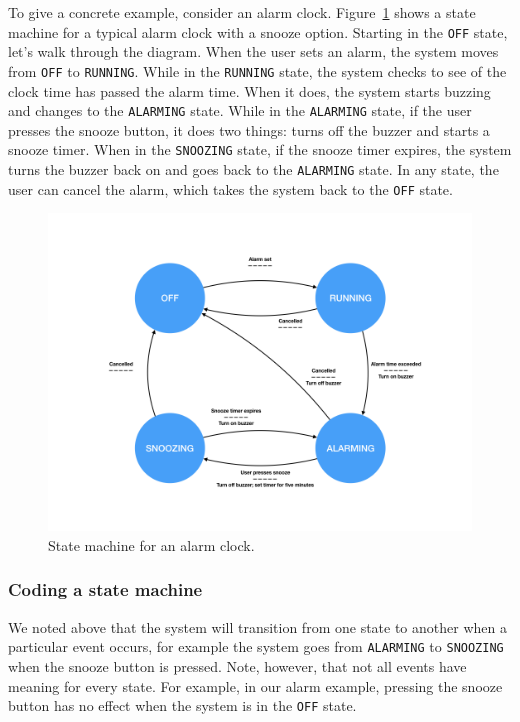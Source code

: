 \documentclass[11pt]{article} %
\begin{document}
To give a concrete example, consider an alarm clock. Figure~\ref{fig:alarm.clock} shows a state machine for a typical alarm clock with a snooze option. Starting in the \verb|OFF| state, let's walk through the diagram. When the user sets an alarm, the system moves from \verb|OFF| to \verb|RUNNING|. While in the \verb|RUNNING| state, the system checks to see of the clock time has passed the alarm time. When it does, the system starts buzzing and changes to the \verb|ALARMING| state. While in the \verb|ALARMING| state, if the user presses the snooze button, it does two things: turns off the buzzer and starts a snooze timer. When in the \verb|SNOOZING| state, if the snooze timer expires, the system turns the buzzer back on and goes back to the \verb|ALARMING| state. In any state, the user can cancel the alarm, which takes the system back to the \verb|OFF| state.

\begin{figure}[htbp]
\centering
\includegraphics[trim=1.5in 1.5in 1.5in 1.5in,clip,width=6in]{figures/alarm-clock.png}
\caption{State machine for an alarm clock.}
\label{fig:alarm.clock}
\end{figure}

\subsubsection*{Coding a state machine}

We noted above that the system will transition from one state to another when a particular event occurs, for example the system goes from \verb|ALARMING| to \verb|SNOOZING| when the snooze button is pressed. Note, however, that not all events have meaning for every state. For example, in our alarm example, pressing the snooze button has no effect when the system is in the \verb|OFF| state.
\end{document}
